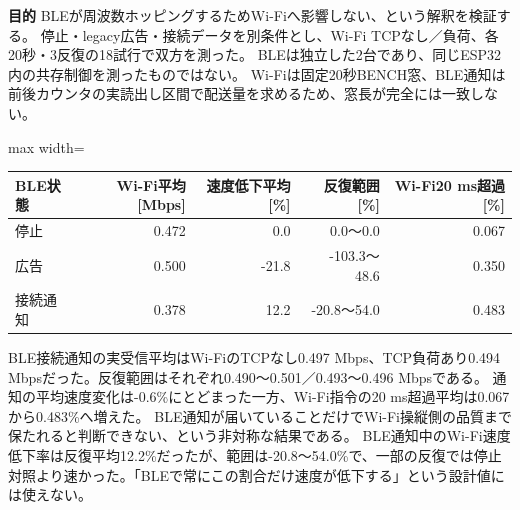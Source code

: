 \documentclass[a4paper,10pt]{ltjsarticle}
\begin{document}
\par\smallskip\noindent\textbf{目的}\quad
BLEが周波数ホッピングするためWi-Fiへ影響しない、という解釈を検証する。
停止・legacy広告・接続データを別条件とし、Wi-Fi TCPなし／負荷、各20秒・3反復の18試行で双方を測った。
BLEは独立した2台であり、同じESP32内の共存制御を測ったものではない。
Wi-Fiは固定20秒BENCH窓、BLE通知は前後カウンタの実読出し区間で配送量を求めるため、窓長が完全には一致しない。
\begin{center}\small\begin{adjustbox}{max width=\linewidth}\begin{tabular}{lrrrr}\toprule
BLE状態 & Wi-Fi平均 [Mbps] & 速度低下平均 [\%] & 反復範囲 [\%] & Wi-Fi20 ms超過 [\%]\\\midrule
停止 & 0.472 & 0.0 & 0.0〜0.0 & 0.067\\
広告 & 0.500 & -21.8 & -103.3〜48.6 & 0.350\\
接続通知 & 0.378 & 12.2 & -20.8〜54.0 & 0.483\\
\bottomrule\end{tabular}\end{adjustbox}\end{center}
BLE接続通知の実受信平均はWi-FiのTCPなし0.497 Mbps、TCP負荷あり0.494 Mbpsだった。反復範囲はそれぞれ0.490〜0.501／0.493〜0.496 Mbpsである。
通知の平均速度変化は-0.6\%にとどまった一方、Wi-Fi指令の20 ms超過平均は0.067から0.483\%へ増えた。
BLE通知が届いていることだけでWi-Fi操縦側の品質まで保たれると判断できない、という非対称な結果である。
BLE通知中のWi-Fi速度低下率は反復平均12.2\%だったが、範囲は-20.8〜54.0\%で、一部の反復では停止対照より速かった。「BLEで常にこの割合だけ速度が低下する」という設計値には使えない。
\end{document}
